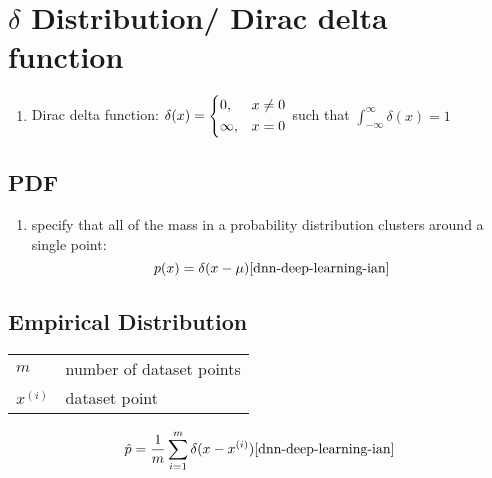 \chapter{$\delta$ Distribution/ Dirac delta function \cite{wiki/Dirac_delta_function}} \label{delta distribution/ Dirac delta function}


\begin{enumerate}[itemsep=0.2cm]
    \item Dirac delta function: 
    ${\displaystyle \delta (x)={\begin{dcases}0,&x\neq 0\\{\infty },&x=0\end{dcases}}}$ 
    such that 
    ${\displaystyle \int _{-\infty }^{\infty }\delta (x)=1}$
\end{enumerate}

\section{PDF \cite{dnn-deep-learning-ian}}

\begin{enumerate}
    \item specify that all of the mass in a probability distribution clusters around a single point:
    \[
        p(x) = \delta(x-\mu) 
        \hfill
        \text{\cite{dnn-deep-learning-ian}}
    \]
\end{enumerate}


\section{Empirical Distribution \cite{dnn-deep-learning-ian}}

\begin{customTableWrapper}{2}
\begin{longtable}{|l|l|}

    $m$ & number of dataset points \\

    $x^{(i)}$ & dataset point \\

\end{longtable}
\end{customTableWrapper}

\[
    \hat{p}
    = \dfrac{1}{m} \dsum_{i=1}^{m} \delta(x-x^{(i)})
    \hfill
    \text{\cite{dnn-deep-learning-ian}}
\]
























